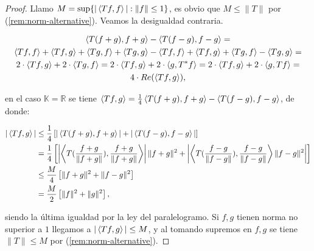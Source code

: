 \begin{proof}
  Llamo $M=\sup \{|\left\langle Tf,f\right\rangle|:\|f\|\le 1\} $, es obvio que $M\le
  \|T\|$ por (\ref{rem:norm-alternative}). Veamos la desigualdad contraria.

  \begin{gather*}
  \left\langle T(f+g),f+g\right\rangle- \left\langle T(f-g),f-g\right\rangle=\\
  \left\langle Tf,f\right\rangle+ \left\langle Tf,g\right\rangle + \left\langle Tg,f\right\rangle+ \left\langle Tg,g\right\rangle-
  \left\langle Tf,f\right\rangle+ \left\langle Tf,g\right\rangle + \left\langle Tg,f\right\rangle- \left\langle Tg,g\right\rangle=\\
  2\cdot \left\langle Tf,g\right\rangle + 2\cdot \left\langle Tg,f\right\rangle=
  2\cdot \left\langle Tf,g\right\rangle + 2\cdot \left\langle g,T^*f\right\rangle=
  2\cdot \left\langle Tf,g\right\rangle + 2\cdot \left\langle g,Tf\right\rangle=\\
  4\cdot Re(\left\langle Tf,g\right\rangle)
  ,\end{gather*}

  en el caso $\mathbb{K}=\mathbb{R}$ se tiene
  $\left\langle Tf,g\right\rangle=\frac{1}{4}\left\langle T(f+g),f+g\right\rangle- \left\langle T(f-g),f-g\right\rangle$, de donde:

  \begin{align*}
    |\left\langle Tf,g\right\rangle| & \le \frac{1}{4}\left[|\left\langle T(f+g),f+g\right\rangle| + |\left\langle T(f-g),f-g\right\rangle|  \right] \\
                   & = \frac{1}{4}\left[\left|\left\langle T(\frac{f+g}{\|f+g\|}),\frac{f+g}{\|f+g\|}\right\rangle\right|\|f+g\|^2
                       +\left|\left\langle T(\frac{f-g}{\|f-g\|}),\frac{f-g}{\|f-g\|}\right\rangle\|f-g\|^2\right|\right]\\
                   & \le \frac{M}{4}\left[ \|f+g\|^2+\|f-g\|^2 \right] \\
                   & = \frac{M}{2} \left[ \|f\|^2+\|g\|^2 \right] 
  ,\end{align*}
  
  siendo la última igualdad por la ley del paralelogramo. Si $f,g$ tienen
  norma no superior a $1$ llegamos a $|\left\langle Tf,g\right\rangle|\le M$, y al tomando
  supremos en $f,g$ se tiene $\|T\|\le  M$ por (\ref{rem:norm-alternative}).





\end{proof}

